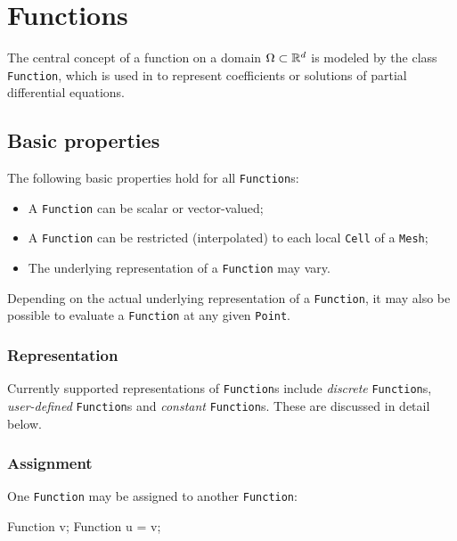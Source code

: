 \chapter{Functions}


The central concept of a function on a domain $\Omega \subset \mathbb{R}^d$ is
modeled by the class \texttt{Function}, which is used in \dolfin{} to
represent coefficients or solutions of partial differential equations.

\section{Basic properties}

The following basic properties hold for all \texttt{Function}s:
\begin{itemize}
\item
  A \texttt{Function} can be scalar or vector-valued;
\item
  A \texttt{Function} can be restricted (interpolated) to each local
  \texttt{Cell} of a \texttt{Mesh};
\item
  The underlying representation of a \texttt{Function} may vary.
\end{itemize}

Depending on the actual underlying representation of a \texttt{Function}, it
may also be possible to evaluate a \texttt{Function} at any given \texttt{Point}.

\subsection{Representation}

Currently supported representations of \texttt{Function}s include
\emph{discrete} \texttt{Function}s, \emph{user-defined}
\texttt{Function}s and \emph{constant} \texttt{Function}s. These are
discussed in detail below.

\subsection{Assignment}

One \texttt{Function} may be assigned to another \texttt{Function}:
\begin{code}
Function v;
Function u = v;
\end{code}

